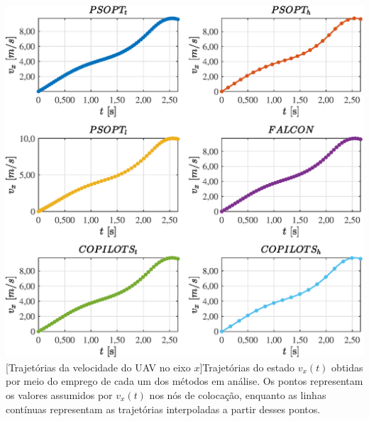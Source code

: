\noindent
\begin{minipage}{\textwidth}
	\vspace{\onelineskip}
	\centering
	\includegraphics[scale=0.7]{fig/resultados/uav/traj/x/v_x}
	[Trajetórias da velocidade do UAV no eixo $x$]{Trajetórias do estado $ v_x(t) $ obtidas por meio do emprego de cada um dos métodos em análise. Os pontos representam os valores assumidos por $ v_x(t) $ nos nós de colocação, enquanto as linhas contínuas representam as trajetórias interpoladas a partir desses pontos.}
	\label{fig:uav:x:v_x}
	\vspace{\onelineskip}
\end{minipage}

